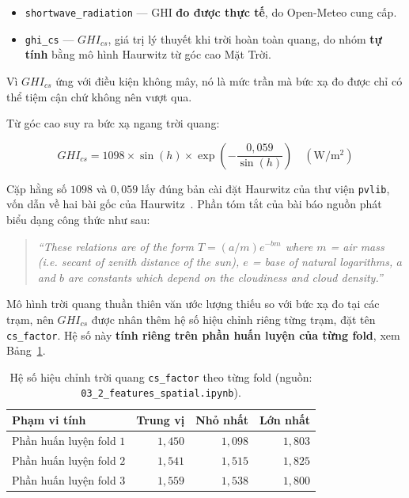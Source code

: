 \begin{itemize}
    \item \texttt{shortwave\_radiation} --- GHI \textbf{đo được thực tế}, do Open-Meteo cung cấp.
    \item \texttt{ghi\_cs} --- $GHI_{cs}$, giá trị lý thuyết khi trời hoàn toàn quang, do nhóm
    \textbf{tự tính} bằng mô hình Haurwitz từ góc cao Mặt Trời.
\end{itemize}

Vì $GHI_{cs}$ ứng với điều kiện không mây, nó là mức trần mà bức xạ đo được chỉ có thể tiệm
cận chứ không nên vượt qua.

Từ góc cao suy ra bức xạ ngang trời quang:

\begin{equation}
GHI_{cs} = 1098 \times \sin(h) \times \exp\!\left(-\frac{0{,}059}{\sin(h)}\right)
\quad (\mathrm{W/m^2})
\end{equation}

Cặp hằng số $1098$ và $0{,}059$ lấy đúng bản cài đặt Haurwitz của thư viện \texttt{pvlib},
vốn dẫn về hai bài gốc của Haurwitz~\cite{haurwitz1945}. Phần tóm tắt của bài báo
nguồn phát biểu dạng công thức như sau:

\begin{quote}\small
\textit{``These relations are of the form $T = (a/m)e^{-bm}$ where $m$ = air mass (i.e. secant of zenith distance of the sun), $e$ = base of natural logarithms, $a$ and $b$ are constants which depend on the cloudiness and cloud density.''}
\end{quote}


Mô hình trời quang thuần thiên văn ước lượng thiếu so với bức xạ đo tại các trạm, nên
$GHI_{cs}$ được nhân thêm hệ số hiệu chỉnh riêng từng trạm, đặt tên \texttt{cs\_factor}. Hệ số
này \textbf{tính riêng trên phần huấn luyện của từng fold}, xem Bảng~\ref{tab:cs_factor}.

\begin{table}[htbp]
\centering
\caption{Hệ số hiệu chỉnh trời quang \texttt{cs\_factor} theo từng fold (nguồn: \texttt{03\_2\_features\_spatial.ipynb}).}
\label{tab:cs_factor}
\small
\begin{tabular}{l r r r}
\toprule
\textbf{Phạm vi tính} & \textbf{Trung vị} & \textbf{Nhỏ nhất} & \textbf{Lớn nhất} \\
\midrule
Phần huấn luyện fold $1$ & $1{,}450$ & $1{,}098$ & $1{,}803$ \\
Phần huấn luyện fold $2$ & $1{,}541$ & $1{,}515$ & $1{,}825$ \\
Phần huấn luyện fold $3$ & $1{,}559$ & $1{,}538$ & $1{,}800$ \\
\bottomrule
\end{tabular}
\end{table}

